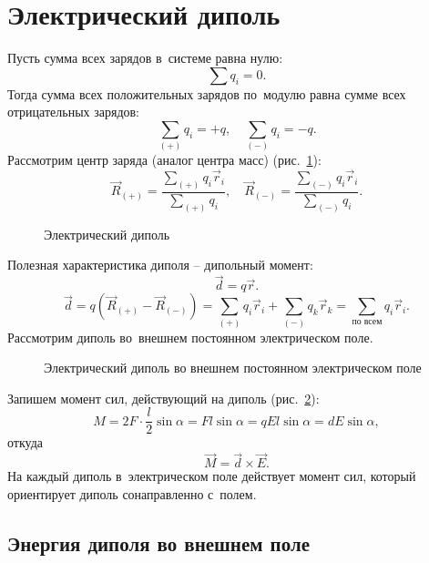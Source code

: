 \section{Электрический диполь}

	Пусть сумма всех зарядов в~системе равна нулю:
		$$\sum q_i = 0.$$
	Тогда сумма всех положительных зарядов по~модулю равна сумме всех отрицательных зарядов:
		$$\sum_{(+)} q_i = +q, \quad \sum_{(-)} q_i = -q.$$
	Рассмотрим центр заряда (аналог центра масс) (рис.~\ref{fig:dipole1}):
		$$\vec{R}_{(+)}=\frac{\sum_{(+)} q_i\vec{r}_i}{\sum_{(+)} q_i}, \quad \vec{R}_{(-)}=\frac{\sum_{(-)} q_i\vec{r}_i}{\sum_{(-)} q_i}.$$
	\begin{figure}[h!]
		\label{fig:dipole1}
		\centering
		
		\caption{Электрический диполь}
	\end{figure}
	Полезная характеристика диполя -- дипольный момент:
	\begin{equation}
		\vec{d}=q\vec{r}.
	\end{equation}
	\begin{equation}
		\vec{d}=q(\vec{R}_{(+)}-\vec{R}_{(-)})=\sum_{(+)} q_i\vec{r}_i + \sum_{(-)} q_k\vec{r}_k=\sum_{\text{по всем}} q_i\vec{r}_i.
	\end{equation}
	Рассмотрим диполь во~внешнем постоянном электрическом поле.
	\begin{figure}[h!]
		\label{fig:dipole2}
		\centering
		
		\caption{Электрический диполь во внешнем постоянном электрическом поле}
	\end{figure}
	Запишем момент сил, действующий на диполь (рис.~\ref{fig:dipole2}):
		$$M=2F\cdot\frac{l}{2}\sin{\alpha}=Fl\sin{\alpha}=qEl\sin{\alpha}=dE\sin{\alpha},$$
	откуда
	\begin{equation}
		\vec{M}=\vec{d}\times\vec{E}.
	\end{equation}
	На каждый диполь в~электрическом поле действует момент сил, который ориентирует диполь сонаправленно с~полем.

		\subsection{Энергия диполя во внешнем поле}

